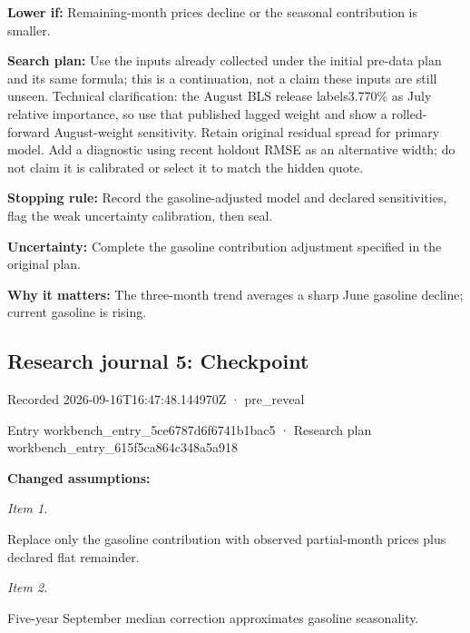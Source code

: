 \documentclass[11pt]{article}
\begin{document}
\par\noindent\textbf{Lower if:} Remaining-month prices decline or the seasonal contribution is smaller.

\par\noindent\textbf{Search plan:} Use the inputs already collected under the initial pre-data plan and its same formula; this is a continuation, not a claim these inputs are still unseen. Technical clarification: the August BLS release labels3.770\% as July relative importance, so use that published lagged weight and show a rolled-forward August-weight sensitivity. Retain original residual spread for primary model. Add a diagnostic using recent holdout RMSE as an alternative width; do not claim it is calibrated or select it to match the hidden quote.

\par\noindent\textbf{Stopping rule:} Record the gasoline-adjusted model and declared sensitivities, flag the weak uncertainty calibration, then seal.

\par\noindent\textbf{Uncertainty:} Complete the gasoline contribution adjustment specified in the original plan.

\par\noindent\textbf{Why it matters:} The three-month trend averages a sharp June gasoline decline; current gasoline is rising.

\subsection*{\textcolor{epdarkgreen}{Research journal 5: Checkpoint}}
Recorded 2026-09-16T16:47:48.144970Z · pre\_reveal


Entry workbench\_en\hspace{0pt}try\_5ce6787d\hspace{0pt}6f6741b1bac5 · Research plan workbench\_en\hspace{0pt}try\_615f5ca8\hspace{0pt}64c348a5a918


\par\noindent\textbf{Changed assumptions:} \par \par\noindent\textit{Item 1.}\par Replace only the gasoline contribution with observed partial-month prices plus declared flat remainder.

\par\noindent\textit{Item 2.}\par Five-year September median correction approximates gasoline seasonality.
\end{document}
